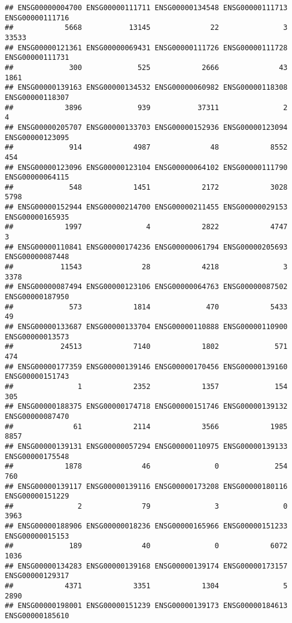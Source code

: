 \documentclass[
]{article}
\begin{document}
\begin{verbatim}
## ENSG00000004700 ENSG00000111711 ENSG00000134548 ENSG00000111713 ENSG00000111716 
##            5668           13145              22               3           33533 
## ENSG00000121361 ENSG00000069431 ENSG00000111726 ENSG00000111728 ENSG00000111731 
##             300             525            2666              43            1861 
## ENSG00000139163 ENSG00000134532 ENSG00000060982 ENSG00000118308 ENSG00000118307 
##            3896             939           37311               2               4 
## ENSG00000205707 ENSG00000133703 ENSG00000152936 ENSG00000123094 ENSG00000123095 
##             914            4987              48            8552             454 
## ENSG00000123096 ENSG00000123104 ENSG00000064102 ENSG00000111790 ENSG00000064115 
##             548            1451            2172            3028            5798 
## ENSG00000152944 ENSG00000214700 ENSG00000211455 ENSG00000029153 ENSG00000165935 
##            1997               4            2822            4747               3 
## ENSG00000110841 ENSG00000174236 ENSG00000061794 ENSG00000205693 ENSG00000087448 
##           11543              28            4218               3            3378 
## ENSG00000087494 ENSG00000123106 ENSG00000064763 ENSG00000087502 ENSG00000187950 
##             573            1814             470            5433              49 
## ENSG00000133687 ENSG00000133704 ENSG00000110888 ENSG00000110900 ENSG00000013573 
##           24513            7140            1802             571             474 
## ENSG00000177359 ENSG00000139146 ENSG00000170456 ENSG00000139160 ENSG00000151743 
##               1            2352            1357             154             305 
## ENSG00000188375 ENSG00000174718 ENSG00000151746 ENSG00000139132 ENSG00000087470 
##              61            2114            3566            1985            8857 
## ENSG00000139131 ENSG00000057294 ENSG00000110975 ENSG00000139133 ENSG00000175548 
##            1878              46               0             254             760 
## ENSG00000139117 ENSG00000139116 ENSG00000173208 ENSG00000180116 ENSG00000151229 
##               2              79               3               0            3963 
## ENSG00000188906 ENSG00000018236 ENSG00000165966 ENSG00000151233 ENSG00000015153 
##             189              40               0            6072            1036 
## ENSG00000134283 ENSG00000139168 ENSG00000139174 ENSG00000173157 ENSG00000129317 
##            4371            3351            1304               5            2890 
## ENSG00000198001 ENSG00000151239 ENSG00000139173 ENSG00000184613 ENSG00000185610 

\end{verbatim}
\end{document}
